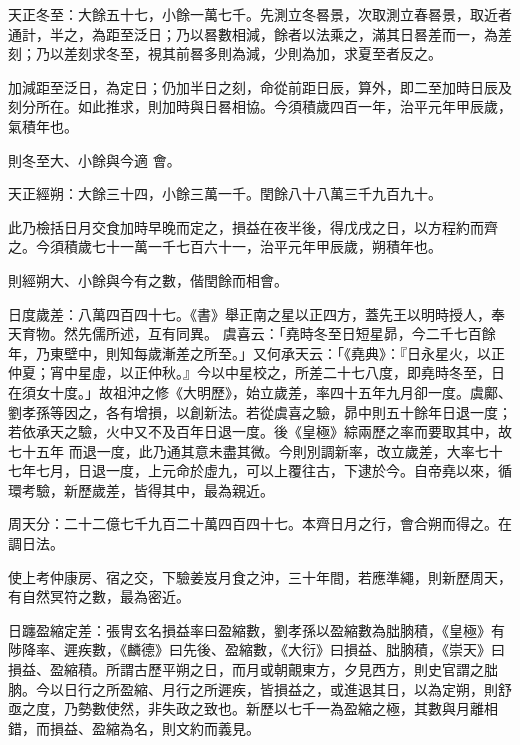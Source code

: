 \begin{pinyinscope}
 天正冬至：大餘五十七，小餘一萬七千。先測立冬晷景，次取測立春晷景，取近者通計，半之，為距至泛日；乃以晷數相減，餘者以法乘之，滿其日晷差而一，為差刻；乃以差刻求冬至，視其前晷多則為減，少則為加，求夏至者反之。



 加減距至泛日，為定日；仍加半日之刻，命從前距日辰，算外，即二至加時日辰及刻分所在。如此推求，則加時與日晷相協。今須積歲四百一年，治平元年甲辰歲，氣積年也。



 則冬至大、小餘與今適
 會。



 天正經朔：大餘三十四，小餘三萬一千。閏餘八十八萬三千九百九十。



 此乃檢括日月交食加時早晚而定之，損益在夜半後，得戊戌之日，以方程約而齊之。今須積歲七十一萬一千七百六十一，治平元年甲辰歲，朔積年也。



 則經朔大、小餘與今有之數，偕閏餘而相會。



 日度歲差：八萬四百四十七。《書》舉正南之星以正四方，蓋先王以明時授人，奉天育物。然先儒所述，互有同異。
 虞喜云：「堯時冬至日短星昴，今二千七百餘年，乃東壁中，則知每歲漸差之所至。」又何承天云：「《堯典》：『日永星火，以正仲夏；宵中星虛，以正仲秋。』今以中星校之，所差二十七八度，即堯時冬至，日在須女十度。」故祖沖之修《大明歷》，始立歲差，率四十五年九月卻一度。虞鄺、劉孝孫等因之，各有增損，以創新法。若從虞喜之驗，昴中則五十餘年日退一度；若依承天之驗，火中又不及百年日退一度。後《皇極》綜兩歷之率而要取其中，故七十五年
 而退一度，此乃通其意未盡其微。今則別調新率，改立歲差，大率七十七年七月，日退一度，上元命於虛九，可以上覆往古，下逮於今。自帝堯以來，循環考驗，新歷歲差，皆得其中，最為親近。



 周天分：二十二億七千九百二十萬四百四十七。本齊日月之行，會合朔而得之。在調日法。



 使上考仲康房、宿之交，下驗姜岌月食之沖，三十年間，若應準繩，則新歷周天，有自然冥符之數，最為密近。



 日躔盈縮定差：張冑玄名損益率曰盈縮數，劉孝孫以盈縮數為朏朒積，《皇極》有陟降率、遲疾數，《麟德》曰先後、盈縮數，《大衍》曰損益、朏朒積，《崇天》曰損益、盈縮積。所謂古歷平朔之日，而月或朝覿東方，夕見西方，則史官謂之朏朒。今以日行之所盈縮、月行之所遲疾，皆損益之，或進退其日，以為定朔，則舒亟之度，乃勢數使然，非失政之致也。新歷以七千一為盈縮之極，其數與月離相錯，而損益、盈縮為名，則文約而義見。




\end{pinyinscope}
